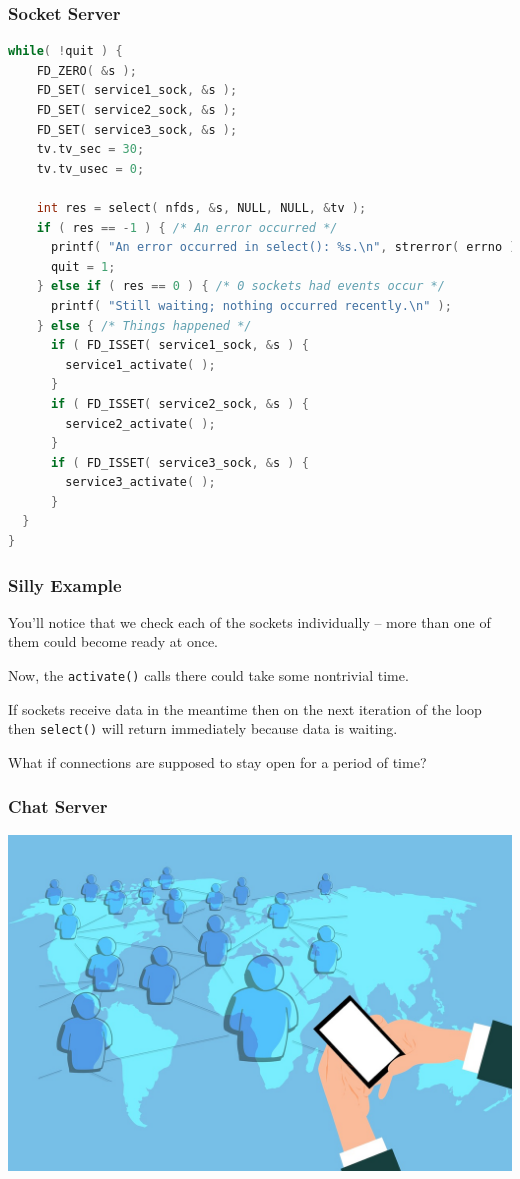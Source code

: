 \begin{frame}[fragile]
\frametitle{Socket Server}

\begin{lstlisting}[language=C]
while( !quit ) {
    FD_ZERO( &s );
    FD_SET( service1_sock, &s );
    FD_SET( service2_sock, &s );
    FD_SET( service3_sock, &s );
    tv.tv_sec = 30;
    tv.tv_usec = 0;
  
    int res = select( nfds, &s, NULL, NULL, &tv );
    if ( res == -1 ) { /* An error occurred */
      printf( "An error occurred in select(): %s.\n", strerror( errno ) );
      quit = 1;
    } else if ( res == 0 ) { /* 0 sockets had events occur */
      printf( "Still waiting; nothing occurred recently.\n" );
    } else { /* Things happened */
      if ( FD_ISSET( service1_sock, &s ) {
        service1_activate( ); 
      }
      if ( FD_ISSET( service2_sock, &s ) {
        service2_activate( ); 
      }
      if ( FD_ISSET( service3_sock, &s ) {
        service3_activate( ); 
      }
  }
}
\end{lstlisting}

\end{frame}


\begin{frame}
\frametitle{Silly Example}

You'll notice that we check each of the sockets individually -- more than one of them could become ready at once. 

Now, the \texttt{activate()} calls there could take some nontrivial time. 

If sockets receive data in the meantime then on the next iteration of the loop then \texttt{select()} will return immediately because data is waiting.

What if connections are supposed to stay open for a period of time?

\end{frame}


\begin{frame}
\frametitle{Chat Server}

\begin{center}
	\includegraphics[width=\textwidth]{images/worldchat.jpg}
\end{center}

\end{frame}

